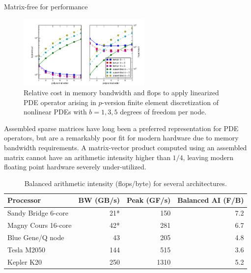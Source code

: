\documentclass[final,t]{beamer}
\begin{document}
\begin{frame}{}
\begin{columns}
\begin{column}{0.31\textwidth}
\begin{block}{Matrix-free for performance}
        \begin{figure}
          \includegraphics[width=0.58\textwidth]{figures/TensorVsAssembly}
          \caption{Relative cost in memory bandwidth and flops to apply
            linearized PDE operator arising in $p$-version finite
            element discretization of nonlinear PDEs with $b=1,3,5$
            degrees of freedom per node.}\label{fig:TensorVsAssembly}
        \end{figure}
        Assembled sparse matrices have long been a preferred representation for PDE operators, but are a remarkably poor fit for modern hardware due to memory bandwidth requirements.
        A matrix-vector product computed using an assembled matrix cannot have an arithmetic intensity higher than $1/4$, leaving modern floating point hardware severely under-utilized.
        \begin{table}
          \centering
          \begin{tabular}{lrrr}
            \toprule
            Processor           & BW (GB/s) & Peak (GF/s) & Balanced AI (F/B) \\
            \midrule
            Sandy Bridge 6-core & 21*       & 150         & 7.2                 \\
            Magny Cours 16-core & 42*       & 281         & 6.7                 \\
            Blue Gene/Q node    & 43        & 205         & 4.8                 \\
            Tesla M2050         & 144       & 515        & 3.6                 \\
            Kepler K20          & 250       & 1310       & 5.2 \\
            \bottomrule
          \end{tabular}
          \caption{Balanced arithmetic intensity (flops/byte) for several architectures.}\label{tab:BalancedAI}

\end{table}
\end{block}
\end{column}
\end{columns}
\end{frame}
\end{document}
